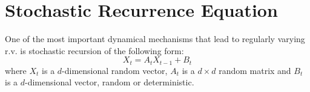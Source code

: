 
\section{Stochastic Recurrence Equation}
One of the most important dynamical mechanisms that lead to regularly
varying r.v. is stochastic recursion of the following form:
\begin{equation}
  \label{eq:rhjyu}
  X_t = A_t X_{t-1} + B_t
\end{equation}
where $X_t$ is a $d$-dimensional random vector, $A_t$ is a $d\times d$
random matrix and $B_t$ is a $d$-dimensional vector, random or
deterministic.


